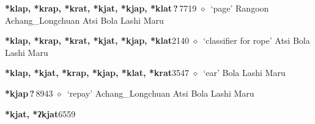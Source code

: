 \begin{list}{}{\leftmargin=1.5em \itemindent=-1.5em}
  \item {\footnotesize \textbf{*klap, *krap, *krat, *kjat, *kjap, *klat\,?\,}}{\tiny 7719}
\hspace{1ex}
         $\diamond$~`page'
         Rangoon 
\hspace{1ex}
         Achang\_Longchuan 
\hspace{1ex}
         Atsi 
\hspace{1ex}
         Bola 
\hspace{1ex}
         Lashi 
\hspace{1ex}
         Maru 
  \item {\footnotesize \textbf{*klap, *krap, *krat, *kjat, *kjap, *klat}}{\tiny 2140}
\hspace{1ex}
         $\diamond$~`classifier for rope'
         Atsi 
\hspace{1ex}
         Bola 
\hspace{1ex}
         Lashi 
\hspace{1ex}
         Maru 
  \item {\footnotesize \textbf{*klap, *kjat, *krap, *kjap, *klat, *krat}}{\tiny 3547}
\hspace{1ex}
         $\diamond$~`ear'
         Bola 
\hspace{1ex}
         Lashi 
\hspace{1ex}
         Maru 
  \item {\footnotesize \textbf{*kjap\,?\,}}{\tiny 8943}
\hspace{1ex}
         $\diamond$~`repay'
         Achang\_Longchuan 
\hspace{1ex}
         Atsi 
\hspace{1ex}
         Bola 
\hspace{1ex}
         Lashi 
\hspace{1ex}
         Maru 
  \item {\footnotesize \textbf{*kjat, *ʔkjat}}{\tiny 6559}
\hspace{1ex}

\end{list}
